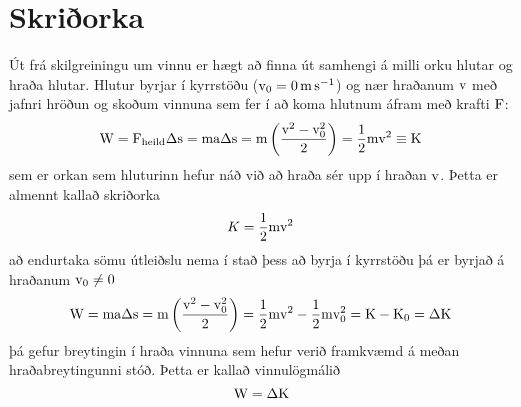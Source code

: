 \section{Skriðorka}
Út frá skilgreiningu um vinnu er hægt að finna út samhengi á milli orku hlutar
og hraða hlutar. Hlutur byrjar í kyrrstöðu ($\uspeed_0 = \SI{0}{\m\per\s}$) 
og nær hraðanum $\textrm{v}$
með jafnri hröðun og skoðum vinnuna sem fer í að koma hlutnum áfram með
krafti $\textrm{F}$:
\begin{equation*}
	\textrm{W} = \textrm{F}_\text{heild} \Delta\textrm{s}
		= \textrm{m} \textrm{a} \Delta\textrm{s}
		= \textrm{m} \left( \frac{\textrm{v}^2 - \textrm{v}^2_0}{2} \right)
		= \frac{1}{2} \textrm{m} \textrm{v}^2
		\equiv \textrm{K}
\end{equation*}
sem er orkan sem hluturinn hefur náð við að hraða sér
upp í hraðan $\textrm{v}$. Þetta er almennt kallað skriðorka
\begin{equation}
	K = \frac{1}{2} \textrm{m} \textrm{v}^2
\end{equation}
að endurtaka sömu útleiðslu nema í stað þess að byrja í kyrrstöðu þá er byrjað
á hraðanum $\textrm{v}_0 \neq 0$
\begin{equation*}
	\textrm{W}
		= \textrm{m} \textrm{a} \Delta\textrm{s}
		= \textrm{m} \left( \frac{\textrm{v}^2 - \textrm{v}^2_0}{2} \right)
		= \frac{1}{2} \textrm{m} \textrm{v}^2 - \frac{1}{2} \textrm{m} \textrm{v}^2_0
		= \textrm{K} - \textrm{K}_0
		= \Delta\textrm{K}
\end{equation*}
þá gefur breytingin í hraða vinnuna sem hefur verið framkvæmd á meðan
hraðabreytingunni stóð. Þetta er kallað vinnulögmálið
\begin{equation}
	\textrm{W} = \Delta\textrm{K}
\end{equation}

